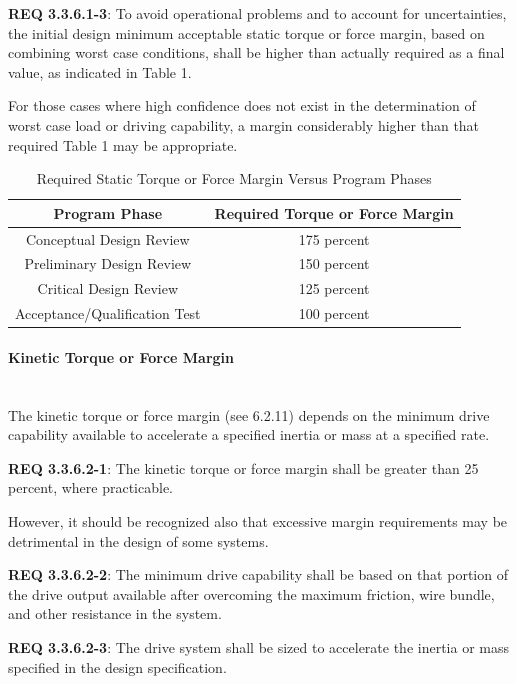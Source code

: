 \documentclass[12pt]{article}
\begin{document}
\noindent \textbf{REQ 3.3.6.1-3}: To avoid operational problems and to account for uncertainties, the initial design minimum acceptable static torque or force margin, based on combining worst case conditions, shall be higher than actually required as a final value, as indicated in Table 1. 

For those cases where high confidence does not exist in the determination of worst case load or driving capability, a margin considerably higher than that required Table 1 may be appropriate.

\begin{table}[h!]
\centering
 \begin{tabular}{|c|c|} 
 \hline
 Program Phase &  Required Torque or Force Margin \\
 \hline
 Conceptual Design Review & 175 percent   \\ 
 Preliminary Design Review & 150 percent   \\
 Critical Design Review & 125 percent  \\
 Acceptance/Qualification Test & 100 percent  \\
 \hline
 \end{tabular}
\caption{Required Static Torque or Force Margin Versus Program Phases}
\label{table:1}
\end{table}


\paragraph{Kinetic Torque or Force Margin} \mbox{} \\ %
The kinetic torque or force margin (see 6.2.11) depends on the minimum drive capability available to accelerate a specified inertia or mass at a specified rate. 

\noindent \textbf{REQ 3.3.6.2-1}: The kinetic torque or force margin shall be greater than 25 percent, where practicable. 

However, it should be recognized also that excessive margin requirements may be detrimental in the design of some systems. 

\noindent \textbf{REQ 3.3.6.2-2}: The minimum drive capability shall be based on that portion of the drive output available after overcoming the maximum friction, wire bundle, and other resistance in the system. 

\noindent \textbf{REQ 3.3.6.2-3}: The drive system shall be sized to accelerate the inertia or mass specified in the design specification. 
\end{document}
